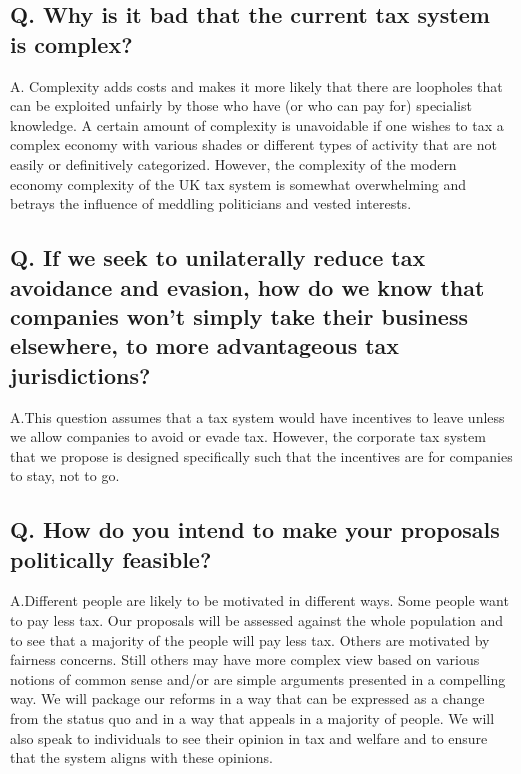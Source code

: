 \documentclass[]{tufte-handout}
\begin{document}
\hypertarget{q.-why-is-it-bad-that-the-current-tax-system-is-complex}{%
\subsection{Q. Why is it bad that the current tax system is
complex?}\label{q.-why-is-it-bad-that-the-current-tax-system-is-complex}}

A. Complexity adds costs and makes it more likely that there are
loopholes that can be exploited unfairly by those who have (or who can
pay for) specialist knowledge. A certain amount of complexity is
unavoidable if one wishes to tax a complex economy with various shades
or different types of activity that are not easily or definitively
categorized. However, the complexity of the modern economy complexity of
the UK tax system is somewhat overwhelming and betrays the influence of
meddling politicians and vested interests.

\hypertarget{q.-if-we-seek-to-unilaterally-reduce-tax-avoidance-and-evasion-how-do-we-know-that-companies-wont-simply-take-their-business-elsewhere-to-more-advantageous-tax-jurisdictions}{%
\subsection{Q. If we seek to unilaterally reduce tax avoidance and
evasion, how do we know that companies won't simply take their business
elsewhere, to more advantageous tax
jurisdictions?}\label{q.-if-we-seek-to-unilaterally-reduce-tax-avoidance-and-evasion-how-do-we-know-that-companies-wont-simply-take-their-business-elsewhere-to-more-advantageous-tax-jurisdictions}}

A.This question assumes that a tax system would have incentives to leave
unless we allow companies to avoid or evade tax. However, the corporate
tax system that we propose is designed specifically such that the
incentives are for companies to stay, not to go.

\hypertarget{q.-how-do-you-intend-to-make-your-proposals-politically-feasible}{%
\subsection{Q. How do you intend to make your proposals politically
feasible?}\label{q.-how-do-you-intend-to-make-your-proposals-politically-feasible}}

A.Different people are likely to be motivated in different ways. Some
people want to pay less tax. Our proposals will be assessed against the
whole population and to see that a majority of the people will pay less
tax. Others are motivated by fairness concerns. Still others may have
more complex view based on various notions of common sense and/or are
simple arguments presented in a compelling way. We will package our
reforms in a way that can be expressed as a change from the status quo
and in a way that appeals in a majority of people. We will also speak to
individuals to see their opinion in tax and welfare and to ensure that
the system aligns with these opinions.
\end{document}

